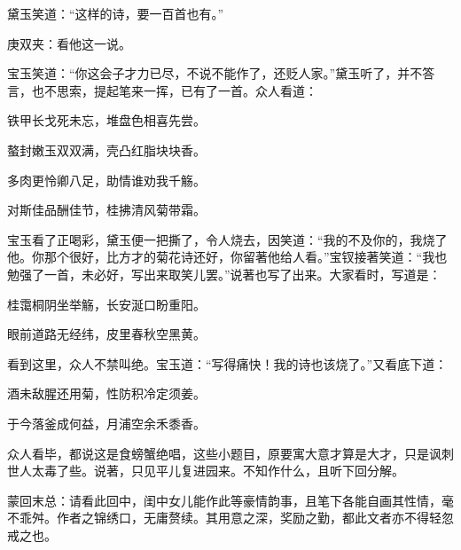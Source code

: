 \begin{parag}
    黛玉笑道：“这样的诗，要一百首也有。”\begin{note}庚双夹：看他这一说。\end{note}宝玉笑道：“你这会子才力已尽，不说不能作了，还贬人家。”黛玉听了，并不答言，也不思索，提起笔来一挥，已有了一首。众人看道：
\end{parag}


\begin{poem}
    \begin{pl}铁甲长戈死未忘，堆盘色相喜先尝。\end{pl}

    \begin{pl}螯封嫩玉双双满，壳凸红脂块块香。\end{pl}

    \begin{pl}多肉更怜卿八足，助情谁劝我千觞。\end{pl}

    \begin{pl}对斯佳品酬佳节，桂拂清风菊带霜。\end{pl}


\end{poem}


\begin{parag}
    宝玉看了正喝彩，黛玉便一把撕了，令人烧去，因笑道：“我的不及你的，我烧了他。你那个很好，比方才的菊花诗还好，你留著他给人看。”宝钗接著笑道：“我也勉强了一首，未必好，写出来取笑儿罢。”说著也写了出来。大家看时，写道是：
\end{parag}


\begin{poem}
    \begin{pl}桂霭桐阴坐举觞，长安涎口盼重阳。\end{pl}

    \begin{pl}眼前道路无经纬，皮里春秋空黑黄。\end{pl}

\end{poem}


\begin{parag}
    看到这里，众人不禁叫绝。宝玉道：“写得痛快！我的诗也该烧了。”又看底下道：
\end{parag}


\begin{poem}
    \begin{pl}酒未敌腥还用菊，性防积冷定须姜。\end{pl}

    \begin{pl}于今落釜成何益，月浦空余禾黍香。\end{pl}

\end{poem}


\begin{parag}
    众人看毕，都说这是食螃蟹绝唱，这些小题目，原要寓大意才算是大才，只是讽刺世人太毒了些。说著，只见平儿复进园来。不知作什么，且听下回分解。
\end{parag}


\begin{parag}
    \begin{note}蒙回末总：请看此回中，闺中女儿能作此等豪情韵事，且笔下各能自画其性情，毫不乖舛。作者之锦绣口，无庸赘续。其用意之深，奖励之勤，都此文者亦不得轻忽戒之也。\end{note}
\end{parag}
